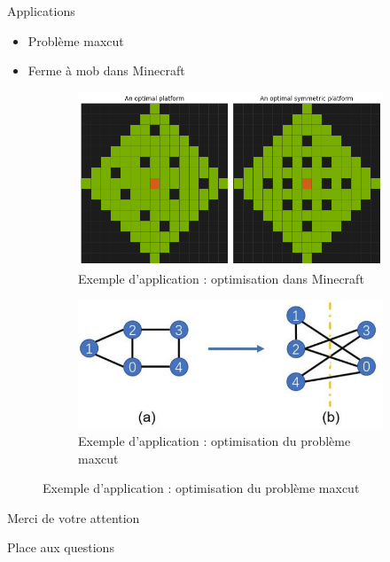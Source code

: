 \documentclass{beamer}
\begin{document}
\begin{frame}{Applications}

\begin{itemize}
    \item Problème maxcut
    \item Ferme à mob dans Minecraft
\end{itemize}

\begin{figure}
    \centering
    \begin{subfigure}{0.4\textwidth}
        \centering
        \includegraphics[width=\textwidth]{img/minecraft-mob-farm.png}
        \caption{Exemple d'application : optimisation dans Minecraft}
    \end{subfigure}
    \begin{subfigure}{0.4\textwidth}
        \centering
        \includegraphics[width=\textwidth]{img/maxcut.png}
        \caption{Exemple d'application : optimisation du problème maxcut}
    \end{subfigure}
\end{figure}

\end{frame}

\begin{frame}{Merci de votre attention}
\begin{center}
    {\Large Place aux questions}
\end{center}
\end{frame}
\end{document}
